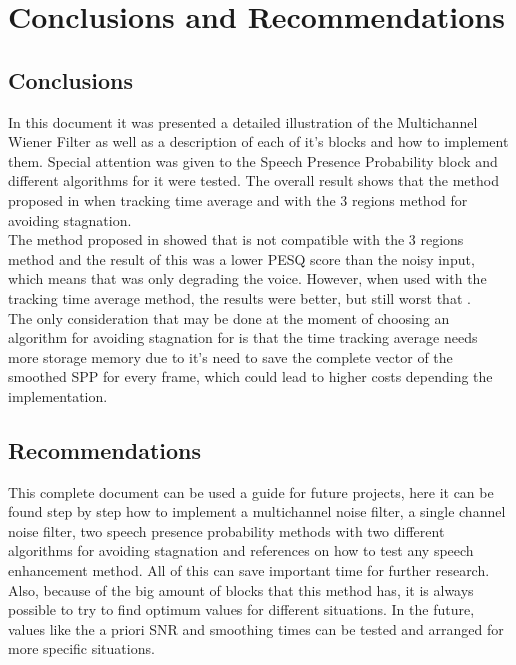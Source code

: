 \chapter{Conclusions and Recommendations}

\section{Conclusions}

In this document it was presented a detailed illustration of the Multichannel Wiener Filter as well as a description of each of it's blocks and how to implement them. Special attention was given to the Speech Presence Probability block and different algorithms for it were tested. The overall result shows that the method proposed in \cite{Gerkmann2011NoisePresence} when tracking time average and with the 3 regions method for avoiding stagnation.\\

The method proposed in \cite{SPPYONG} showed that is not compatible with the 3 regions method and the result of this was a lower PESQ score than the noisy input, which means that was only degrading the voice. However, when used with the tracking time average method, the results were better, but still worst that \cite{Gerkmann2011NoisePresence}.\\

The only consideration that may be done at the moment of choosing an algorithm for avoiding stagnation for \cite{Gerkmann2011NoisePresence} is that the time tracking average needs more storage memory due to it's need to save the complete vector of the smoothed SPP for every frame, which could lead to higher costs depending the implementation.




\section{Recommendations}

This complete document can be used a guide for future projects, here it can be found step by step how to implement a multichannel noise filter, a single channel noise filter, two speech presence probability methods with two different algorithms for avoiding stagnation and references on how to test any speech enhancement method. All of this can save important time for further research. \\

Also, because of the big amount of blocks that this method has, it is always possible to try to find optimum values for different situations. In the future, values like the a priori SNR and smoothing times can be tested and arranged for more specific situations.\\

